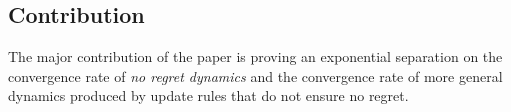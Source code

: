 


\subsection{Contribution}
The major contribution of the paper is proving an exponential separation on
the convergence rate of \emph{no regret dynamics} and the convergence rate of
more general dynamics produced by update rules that do not ensure no regret.

